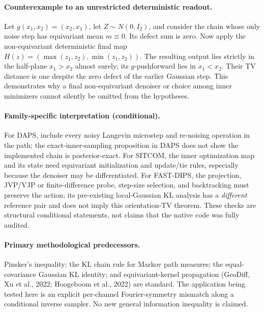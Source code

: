 \paragraph{Counterexample to an unrestricted deterministic readout.}
Let \(g(x_1,x_2)=(x_2,x_1)\), let
\(Z\sim N(0,I_2)\), and consider the chain whose only noise step has
equivariant mean \(m\equiv0\). Its defect sum is zero. Now apply the
non-equivariant deterministic final map
\(H(z)=(\max(z_1,z_2),\min(z_1,z_2))\).
The resulting output lies strictly in the half-plane
\(x_1>x_2\) almost surely; its \(g\)-pushforward lies in
\(x_1<x_2\). Their TV distance is one despite the zero defect
of the earlier Gaussian step. This demonstrates why a final
non-equivariant denoiser or choice among inner minimizers cannot
silently be omitted from the hypotheses.

\paragraph{Family-specific interpretation (conditional).}
For DAPS, include every noisy Langevin microstep and re-noising
operation in the path; the exact-inner-sampling proposition in
DAPS does not show the implemented chain is posterior-exact.
For SITCOM, the inner optimization map and its state need
equivariant initialization and update/tie rules, especially because
the denoiser may be differentiated.
For FAST-DIPS, the projection, JVP/VJP or finite-difference
probe, step-size selection, and backtracking must preserve the
action; its pre-existing local-Gaussian KL analysis has a
\emph{different} reference pair and does not imply this
orientation-TV theorem. These checks are structural conditional
statements, not claims that the native code was fully audited.

\paragraph{Primary methodological predecessors.}
Pinsker's inequality; the KL chain rule for Markov path measures;
the equal-covariance Gaussian KL identity; and equivariant-kernel
propagation (GeoDiff, Xu et al., 2022; Hoogeboom et al., 2022)
are standard. The application being tested here is an explicit
per-channel Fourier-symmetry mismatch along a conditional inverse
sampler. No new general information inequality is claimed.
